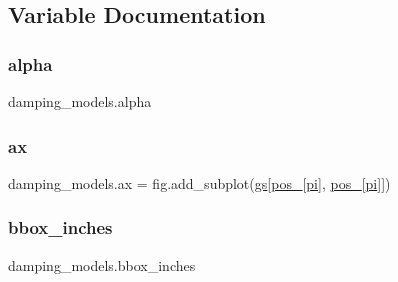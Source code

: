 \subsection{Variable Documentation}
\mbox{\label{namespacedamping__models_a12759dcbb254e93503e78397e053b7b6}} 
\subsubsection{\texorpdfstring{alpha}{alpha}}
{\footnotesize\ttfamily damping\+\_\+models.\+alpha}

\mbox{\label{namespacedamping__models_a84508bd0b8d775cdcd1ccecf22cec382}} 
\subsubsection{\texorpdfstring{ax}{ax}}
{\footnotesize\ttfamily damping\+\_\+models.\+ax = fig.\+add\+\_\+subplot(\hyperlink{namespacedamping__models_a7c226621eacbd06fba95e28c7a34d0bd}{gs}\mbox{[}\hyperlink{namespacedamping__models_af6c1bce059c3e37933376e9c30e9524c}{pos\+\_}\mbox{[}\hyperlink{constants_8h_a43016d873124d39034edb8cd164794db}{pi}\mbox{]}, \hyperlink{namespacedamping__models_ac2eaf7fd8a5911f49de682dcbbc5d277}{pos\+\_}\mbox{[}\hyperlink{constants_8h_a43016d873124d39034edb8cd164794db}{pi}\mbox{]}\mbox{]})}

\mbox{\label{namespacedamping__models_a139d3c226404875841f2e82b34320829}} 
\subsubsection{\texorpdfstring{bbox\+\_\+inches}{bbox\_inches}}
{\footnotesize\ttfamily damping\+\_\+models.\+bbox\+\_\+inches}

\mbox{\label{namespacedamping__models_a7b9f8978e3e936f2dfb6ed47dbd722cc}} 
